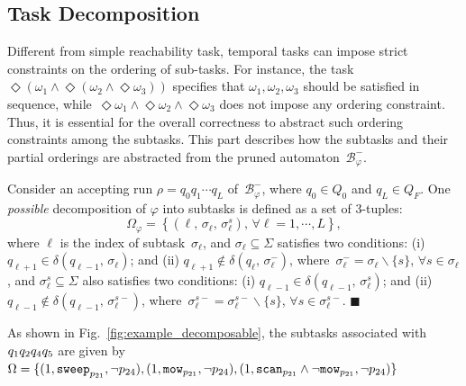 \subsection{Task Decomposition}\label{subsubsec:task-decompose}
Different from simple reachability task,
temporal tasks can impose strict constraints on the ordering of sub-tasks.
For instance, the task~$\Diamond (\omega_1 \land \Diamond (\omega_2 \land \Diamond\omega_3)) $
specifies that $\omega_1,\omega_2,\omega_3$ should be satisfied in sequence,
while~$\Diamond\omega_1\land\Diamond\omega_2\land\Diamond\omega_3$ does not impose any ordering constraint.
Thus, it is essential for the overall correctness to abstract such ordering constraints among the subtasks.
This part describes how the subtasks and their partial orderings are abstracted from the pruned automaton~$\mathcal{B}_{\varphi}^{-}$.

\begin{definition} \label{def:subtasks}
Consider an accepting run $\rho=q_0q_1\cdots q_L$ of~$\mathcal{B}_{\varphi}^{-}$,
where $q_0\in Q_0$ and $q_L\in Q_F$.
One \emph{possible} decomposition of $\varphi$ into subtasks is defined
as a set of 3-tuples:
\begin{equation}\label{eq:subtask}
\Omega_{\varphi} = \left\{(\ell,\, \sigma_\ell,\, \sigma^{s}_\ell),\, \forall \ell=1,\cdots,L\right\},
\end{equation}
where $\ell$ is the index of subtask~$\sigma_\ell$,
and $\sigma_\ell\subseteq \Sigma$ satisfies two conditions:
(i) $q_{\ell+1} \in \delta(q_{\ell-1},\,\sigma_\ell)$;
and (ii) $q_{\ell+1} \notin \delta(q_\ell,\,\sigma^-_\ell)$, where~$\sigma^-_\ell =  \sigma_\ell \backslash \{s\}$, $\forall s\in \sigma_\ell$, 
and $\sigma^{s}_\ell\subseteq \Sigma$ also satisfies two conditions:
(i) $q_{\ell-1} \in \delta(q_{\ell-1},\,\sigma^{s}_\ell)$;
and (ii) $q_{\ell-1} \notin \delta(q_{\ell-1},\,\sigma^{s-}_\ell)$, where~$\sigma^{s-}_\ell =  \sigma^{s-}_\ell \backslash \{s\}$, $\forall s\in \sigma^{s-}_\ell$. 
\hfill $\blacksquare$
\end{definition}

\begin{example}
	\label{example:subtask}
        {As shown in Fig.~\ref{fig:example_decomposable},
          the subtasks associated with~$q_1q_2\\q_4q_5$ are given
          by~$\Omega=\{(1,\texttt{sweep}_{p_{21}} ,\lnot p_{24}),
(1,\texttt{mow}_{p_{21}} ,\lnot p_{24}),\\
(1,\texttt{scan}_{p_{21}}\land\lnot \texttt{mow}_{p_{21}} ,\lnot p_{24})\}$}
\end{example}

